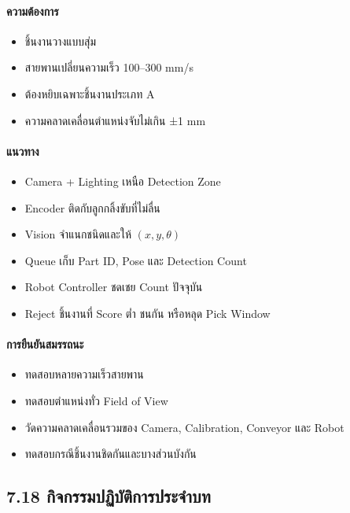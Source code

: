 \paragraph{ความต้องการ}

\begin{itemize}
    \item ชิ้นงานวางแบบสุ่ม
    \item สายพานเปลี่ยนความเร็ว 100–300 mm/s
    \item ต้องหยิบเฉพาะชิ้นงานประเภท A
    \item ความคลาดเคลื่อนตำแหน่งจับไม่เกิน ±1 mm
\end{itemize}

\paragraph{แนวทาง}

\begin{itemize}
    \item Camera + Lighting เหนือ Detection Zone
    \item Encoder ติดกับลูกกลิ้งขับที่ไม่ลื่น
    \item Vision จำแนกชนิดและให้ $(x,y,\theta)$
    \item Queue เก็บ Part ID, Pose และ Detection Count
    \item Robot Controller ชดเชย Count ปัจจุบัน
    \item Reject ชิ้นงานที่ Score ต่ำ ชนกัน หรือหลุด Pick Window
\end{itemize}

\paragraph{การยืนยันสมรรถนะ}

\begin{itemize}
    \item ทดสอบหลายความเร็วสายพาน
    \item ทดสอบตำแหน่งทั่ว Field of View
    \item วัดความคลาดเคลื่อนรวมของ Camera, Calibration, Conveyor และ Robot
    \item ทดสอบกรณีชิ้นงานชิดกันและบางส่วนบังกัน
\end{itemize}

\newpage

\subsection{7.18 กิจกรรมปฏิบัติการประจำบท}

